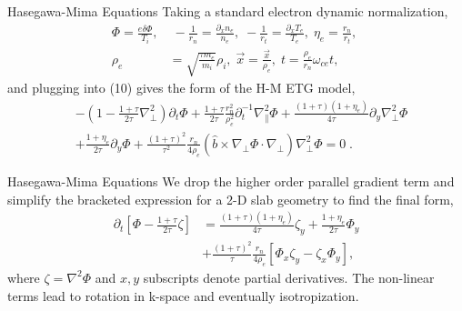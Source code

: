 \documentclass[aspectratio=43]{beamer}
\begin{document}
   \begin{frame}{Hasegawa-Mima Equations}
      \quad Taking a standard electron dynamic normalization,
      \begin{equation}
      \begin{aligned}
         \Phi    = \frac{e\delta\Phi}{T_i},&\; -\frac{1}{r_n}=\frac{\partial_x n_e}{n_e},\; -\frac{1}{r_t}=\frac{\partial_x T_e}{T_e},\; \eta_e=\frac{r_n}{r_t},\; \\
         \rho_e &= \sqrt{\frac{\tau m_e}{m_i}}\rho_i,\; \vec{x} = \frac{\vec{x}}{\rho_e},\; t=\frac{\rho_e}{r_n}\omega_{ce}t,
      \end{aligned}
      \end{equation}
   and plugging into (10) gives the form of the H-M ETG model,
      \begin{equation}
      \begin{aligned}
         &-(1-\frac{1+\tau}{2\tau}\nabla_{\perp}^2)\partial_t\Phi + \frac{1+\tau}{2\tau}\frac{r_n^2}{\rho_e^2}\partial_t^{-1}\nabla_{\parallel}^2\Phi
          + \frac{(1+\tau)(1+\eta_e)}{4\tau}\partial_y\nabla_{\perp}^2\Phi \\
         &+ \frac{1+\eta_e}{2\tau}\partial_y\Phi + \frac{(1+\tau)^2}{\tau^2}\frac{r_n}{4\rho_e}(\hat{b}\times\nabla_{\perp}\Phi\cdot\nabla_{\perp})\nabla_{\perp}^2\Phi = 0\;.
      \end{aligned}
      \end{equation}
   \end{frame}

   \begin{frame}{Hasegawa-Mima Equations}
      \quad We drop the higher order parallel gradient term and simplify the bracketed expression for a 2-D slab geometry to find the final
   form,
      \begin{equation}
      \begin{aligned}
         \partial_t[\Phi-\frac{1+\tau}{2\tau}\zeta] &= \frac{(1+\tau)(1+\eta_e)}{4\tau}\zeta_y + \frac{1+\eta_e}{2\tau}\Phi_y \\
                                                    &+ \frac{(1+\tau)^2}{\tau}\frac{r_n}{4\rho_e}[\Phi_x\zeta_y-\zeta_x\Phi_y],
      \end{aligned}
      \end{equation}
   where $\zeta = \nabla^2\Phi$ and $x,y$ subscripts denote partial derivatives. The non-linear terms lead to rotation in k-space and eventually isotropization.
   \end{frame}
\end{document}
